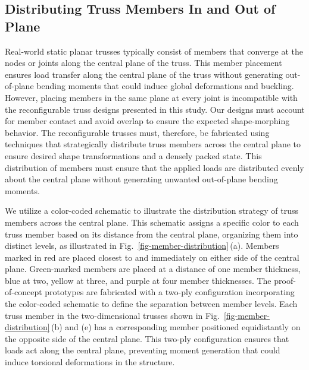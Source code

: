 \subsection{Distributing Truss Members In and Out of Plane}\label{02-subsec-member-distro}
Real-world static planar trusses typically consist of members that converge at the nodes or joints along the central plane of the truss. This member placement ensures load transfer along the central plane of the truss without generating out-of-plane bending moments that could induce global deformations and buckling. However, placing members in the same plane at every joint is incompatible with the reconfigurable truss designs presented in this study. Our designs must account for member contact and avoid overlap to ensure the expected shape-morphing behavior. The reconfigurable trusses must, therefore, be fabricated using techniques that strategically distribute truss members across the central plane to ensure desired shape transformations and a densely packed state. This distribution of members must ensure that the applied loads are distributed evenly about the central plane without generating unwanted out-of-plane bending moments.

We utilize a color-coded schematic to illustrate the distribution strategy of truss members across the central plane. This schematic assigns a specific color to each truss member based on its distance from the central plane, organizing them into distinct levels, as illustrated in Fig.~\ref{fig-member-distribution}\,(a). Members marked in red are placed closest to and immediately on either side of the central plane. Green-marked members are placed at a distance of one member thickness, blue at two, yellow at three, and purple at four member thicknesses. The proof-of-concept prototypes are fabricated with a two-ply configuration incorporating the color-coded schematic to define the separation between member levels. Each truss member in the two-dimensional trusses shown in Fig.~\ref{fig-member-distribution}\,(b) and (e) has a corresponding member positioned equidistantly on the opposite side of the central plane. This two-ply configuration ensures that loads act along the central plane, preventing moment generation that could induce torsional deformations in the structure.


